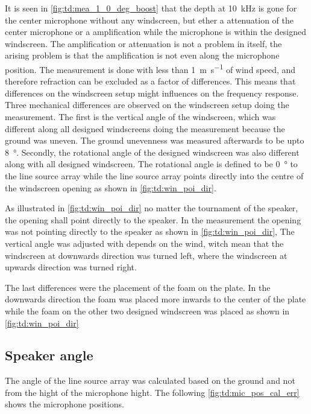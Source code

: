 It is seen in \autoref{fig:td:mea_1_0_deg_boost} that the depth at \SI{10}{\kilo\hertz} is gone for the center microphone without any windscreen, but ether a  attenuation of the center microphone or a  amplification while the microphone is within the designed windscreen. The amplification or attenuation is not a problem in itself, the arising problem is that the amplification is not even along the microphone position. The measurement is done with less than \SI{1}{\meter\per\second} of wind speed, and therefore refraction can be excluded as a factor of differences. This means that differences on the windscreen setup might influences on the frequency response. 
Three mechanical differences are observed on the windscreen setup doing the measurement. The first is the vertical angle of the windscreen, which was different along all designed windscreens doing the measurement because the ground was uneven. The ground unevenness was measured afterwards to be upto \SI{8}{\degree}. Secondly, the rotational angle of the designed windscreen was also different along with all designed windscreen. The rotational angle is defined to be \SI{0}{\degree} to the line source array while the line source array points directly into the centre of the windscreen opening as shown in \autoref{fig:td:win_poi_dir}.


As illustrated in \autoref{fig:td:win_poi_dir} no matter the tournament of the speaker, the opening shall point directly to the speaker. In the measurement the opening was not pointing directly to the speaker as shown in \autoref{fig:td:win_poi_dir}, The vertical angle was adjusted with depends on the wind, witch mean that the windscreen at downwards direction was turned left, where the windscreen at upwards direction was turned right. 

The last differences were the placement of the foam on the plate. In the downwards direction the foam was placed more inwards to the center of the plate while the foam on the other two designed windscreen was placed as shown in \autoref{fig:td:win_poi_dir}


\subsection{Speaker angle}\label{sec:des:measuring_angle}
The angle of the line source array was calculated based on the ground and not from the hight of the microphone hight. The following \autoref{fig:td:mic_pos_cal_err} shows the microphone positions.

